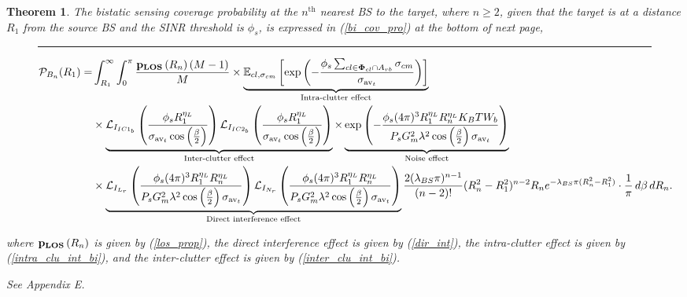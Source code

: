 \documentclass[journal]{IEEEtran}
\newtheorem{theorem}{\textbf{Theorem}}
\begin{document}
\begin{theorem} \label{bi_det}
The bistatic sensing coverage probability at the $n^\text{th}$ nearest BS to the target, where $n \geq 2$, given that the target is at a distance $R_1$ from the source BS and the SINR threshold is $\phi_s$, is expressed in (\ref{bi_cov_pro}) at the bottom of next page,
\begin{figure*}
\hrule
\small
\begin{equation}\label{bi_cov_pro}
\begin{aligned}
\mathcal{P}_{B_n} (R_1) = & \int_{R_1}^{\infty} \int_{0}^{\pi}  \frac{ \bold p_{\bold{LOS}}\left(R_n\right)(M-1)}{M} \times \underbrace{\mathbb{E}_{cl, \sigma_{cm}} \left[ \exp \left( - \frac{\phi_s \sum_{cl \in \bold\Phi_{cl} \cap A_{rb}} \sigma_{cm}}{\sigma_{\text{av}_t}} \right) \right]}_{\text{Intra-clutter effect}} \\
& \times \underbrace{\mathcal{L}_{I_{IC1_b}} \left( \frac{\phi_s R_1^{\eta_L}}{\sigma_{\text{av}_t} \cos \left( \frac{\beta}{2} \right)} \right) \mathcal{L}_{I_{IC2_b}} \left( \frac{\phi_s R_1^{\eta_L}}{\sigma_{\text{av}_t} \cos \left( \frac{\beta}{2} \right)} \right)}_{\text{Inter-clutter effect}} \times \underbrace{\exp \left( - \frac{\phi_s (4\pi)^3 R_1^{\eta_L} R_n^{\eta_L} K_B T W_b}{P_s G_m^2 \lambda^2 \cos \left( \frac{\beta}{2} \right) \sigma_{\text{av}_t}} \right)}_{\text{Noise effect}} \\
& \times \underbrace{\mathcal{L}_{I_{L_r}} \left( \frac{\phi_s (4\pi)^3 R_1^{\eta_L} R_n^{\eta_L}}{P_s G_m^2 \lambda^2 \cos \left( \frac{\beta}{2} \right) \sigma_{\text{av}_t}} \right) \mathcal{L}_{I_{N_r}} \left( \frac{\phi_s (4\pi)^3 R_1^{\eta_L} R_n^{\eta_L}}{P_s G_m^2 \lambda^2 \cos \left( \frac{\beta}{2} \right) \sigma_{\text{av}_t}} \right)}_{\text{Direct interference effect}} \frac{2 (\lambda_{BS} \pi)^{n-1}}{(n-2)!} (R_n^2 - R_1^2)^{n-2} R_n e^{-\lambda_{BS} \pi (R_n^2 - R_1^2)} \cdot \frac{1}{\pi} \, d\beta \, dR_n.
\end{aligned}
\end{equation}
\normalsize
\end{figure*}
where $\bold p_{\bold{LOS}}\left(R_n\right)$  is given by (\ref{los_prop}), the direct interference effect is given by (\ref{dir_int}), the intra-clutter effect is given by (\ref{intra_clu_int_bi}), and the inter-clutter effect is given by (\ref{inter_clu_int_bi}).
\begin{IEEEproof}
See Appendix E.
\end{IEEEproof}
\end{theorem}
\end{document}
